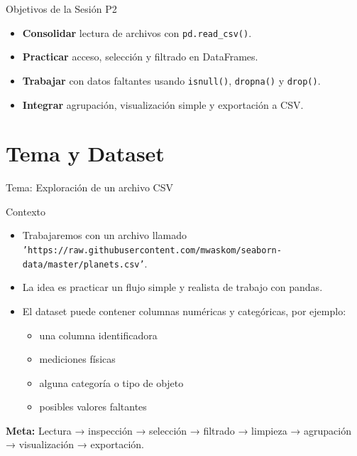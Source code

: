\documentclass[10pt]{beamer}
\begin{document}
\begin{frame}{Objetivos de la Sesión P2}
  \begin{itemize}
    \item \textbf{Consolidar} lectura de archivos con \texttt{pd.read\_csv()}.
    \item \textbf{Practicar} acceso, selección y filtrado en DataFrames.
    \item \textbf{Trabajar} con datos faltantes usando \texttt{isnull()}, \texttt{dropna()} y \texttt{drop()}.
    \item \textbf{Integrar} agrupación, visualización simple y exportación a CSV.
  \end{itemize}
\end{frame}

\section{Tema y Dataset}

\begin{frame}{Tema: Exploración de un archivo CSV}
  \begin{block}{Contexto}
    \begin{itemize}
      \item Trabajaremos con un archivo llamado \texttt{'https://raw.githubusercontent.com/mwaskom/seaborn-data/master/planets.csv'}.
      \item La idea es practicar un flujo simple y realista de trabajo con pandas.
      \item El dataset puede contener columnas numéricas y categóricas, por ejemplo:
        \begin{itemize}
          \item una columna identificadora
          \item mediciones físicas
          \item alguna categoría o tipo de objeto
          \item posibles valores faltantes
        \end{itemize}
    \end{itemize}
  \end{block}
  \textbf{Meta:} Lectura → inspección → selección → filtrado → limpieza → agrupación → visualización → exportación.
\end{frame}
\end{document}
